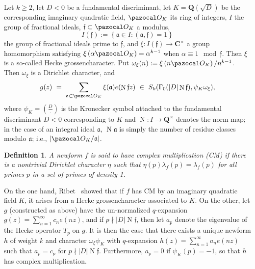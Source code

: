 \documentclass[11pt,reqno]{amsart} \usepackage{fullpage}
\newtheorem{defn}[lemma]{Definition}
\renewcommand{\geq}{\geqslant}
\newcommand{\C}{\ensuremath{\mathbf{C}}}
\newcommand{\Q}{\ensuremath{\mathbf{Q}}}
\newcommand{\ra}{\rightarrow}
\newcommand\be{\begin{equation}}
\newcommand\ee{\end{equation}}
\renewcommand{\a}{{\mathfrak f}}
\DeclareMathOperator{\Nm}{N}
\numberwithin{equation}{section}
\begin{document}
Let $k\geq2$, let $D<0$ be a fundamental discriminant, let $K=\Q(\sqrt D)$ be the
corresponding imaginary quadratic field, $\pazocal O_K$ its ring of integers,
$I$ the group of fractional ideals, $\a\subset\pazocal O_K$ a modulus,
\be I(\a):=\left\{\mathfrak a\in I:(\mathfrak a,\a)=1\right\}\ee
the group of fractional ideals prime to $\a$, and $\xi:I(\a)\ra\C^\times$ a group
homomorphism satisfying $\xi\left(\alpha\pazocal O_K\right)=\alpha^{k-1}$ when
$\alpha\equiv1\mod\a$. Then $\xi$ is a so-called Hecke grossencharacter.
Put $\omega_\xi(n):=\xi\left(n\pazocal O_K\right)/n^{k-1}$. Then $\omega_\xi$ is a
Dirichlet character, and
\be\label{eq:cmdef} g(z)\ =\ \sum_{\mathfrak a\subset\pazocal O_K}\xi(\mathfrak a)e(\Nm\a z)\ \in\ S_k(\Gamma_0(|D|\Nm\a),\psi_K\omega_\xi),\ee
where $\psi_K=\left(\frac D\cdot\right)$ is
the Kronecker symbol attached to the fundamental discriminant $D<0$ corresponding to $K$
and $\Nm:I\ra\Q^\times$ denotes the norm map; in the case of an integral ideal
$\mathfrak a$, $\Nm\mathfrak a$ is simply the number of residue classes modulo
$\mathfrak a$; i.e., $\left|\pazocal O_K/\mathfrak a\right|$.

\begin{defn} A newform $f$ is said to have complex multiplication (CM) if there is a
  nontrivial Dirichlet character $\eta$ such that $\eta(p)\lambda_f(p)=\lambda_f(p)$
  for all primes $p$ in a set of primes of density 1.\end{defn}
On the one hand, Ribet~\cite{ribet} showed that if $f$ has CM by an imaginary quadratic field
$K$, it arises from a Hecke grossencharacter associated to $K$.
On the other, let $g$ (constructed as above) have the un-normalized $q$-expansion
$g(z)=\sum_{n=1}^\infty c_ne(nz)$, and if $p\nmid|D|\Nm\a$, then let $a_p$ denote the
eigenvalue of the Hecke operator $T_p$ on $g$.
It is then the case \cite[Corollary 3.5]{ribet} that there exists a unique newform $h$
of weight $k$ and character $\omega_\xi\psi_K$ with $q$-expansion
$h(z)=\sum_{n=1}^\infty a_ne(nz)$ such that $a_p=c_p$ for $p\nmid|D|\Nm\a$. Furthermore,
$a_p=0$ if $\psi_K(p)=-1$, so that $h$ has complex multiplication.
\end{document}
